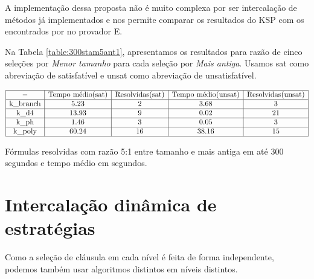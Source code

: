 A implementação dessa proposta não é muito complexa por ser intercalação de métodos já implementados e nos permite comparar os resultados do KSP com os encontrados por \cite{stephan} no provador E.


Na Tabela \ref{table:300stam5ant1}, apresentamos os resultados para razão de cinco seleções por \textit{Menor tamanho} para cada seleção por \textit{Mais antiga}. Usamos sat como abreviação de satisfatível e unsat como abreviação de unsatisfatível.
\begin{table*}[t]
	\[
\begin{array}{|c|c|c|c|c|}
	\hline - & \textnormal{Tempo médio(sat)} & \textnormal{Resolvidas(sat)} & \textnormal{Tempo médio(unsat)} & \textnormal{Resolvidas(unsat)} \\
	
	\hline \textnormal{k\_branch} & 5.23 & 2 & 3.68 & 3 \\
	\hline \textnormal{k\_d4} & 13.93 & 9 & 0.02 & 21 \\
	\hline \textnormal{k\_ph} & 1.46 & 3 & 0.05 & 3 \\
	\hline \textnormal{k\_poly} & 60.24 & 16 & 38.16 & 15 \\
	
	\hline
	
\end{array}
	\]
\caption{Fórmulas resolvidas com razão 5:1 entre tamanho e mais antiga em até 300 segundos e tempo médio em segundos.}
\label{table:300stam5ant1}
\end{table*} %


\section{Intercalação dinâmica de estratégias}
Como a seleção de cláusula em cada nível é feita de forma independente, podemos também usar algoritmos distintos em níveis distintos.


